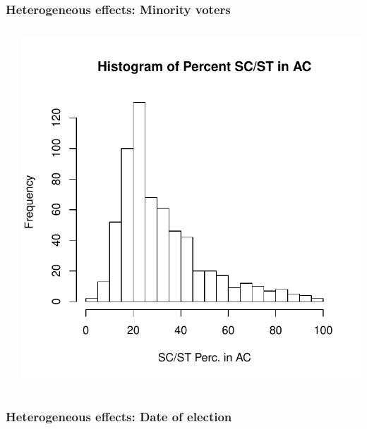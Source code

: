 \documentclass{beamer}
\begin{document}
\begin{frame}
\frametitle{Heterogeneous effects: Minority voters}
\begin{columns}[T] %
\begin{column}{.48\textwidth}
\end{column}%
\hfill%
\begin{column}{.48\textwidth}
\vspace{-10pt}
\includegraphics[scale=.45]{../Figures/histscstpc.pdf}
\end{column}%
\end{columns}
\end{frame}

\begin{frame}
\frametitle{Heterogeneous effects: Date of election}
\begin{columns}[T] %
\begin{column}{.55\textwidth}
\scalebox{.6}{
\vbox{%
\vspace{-40pt}
 }}
\end{column}%
\hfill%
\begin{column}{.35\textwidth}
\end{column}%
\end{columns}
\end{frame}
\end{document}

